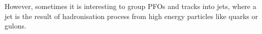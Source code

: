 However, sometimes it is interesting to group PFOs and tracks into jets, where a jet is the result of hadronisation process from high energy particles like quarks or gulons.

